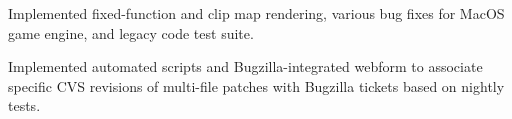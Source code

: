 \documentclass[]{jhearn-resume}
\begin{document}
\begin{minipage}[t]{0.64\textwidth}
%
\begin{tightemize}
\item Implemented fixed-function and clip map rendering, various bug fixes for MacOS game engine, and legacy code test suite.
\end{tightemize}
\sectionsep
%
%
\begin{tightemize}
\item Implemented automated scripts and Bugzilla-integrated webform to
associate specific CVS revisions of multi-file patches with Bugzilla tickets based on nightly tests.
\end{tightemize}
\sectionsep

\end{minipage}
\hfill
\end{document}
